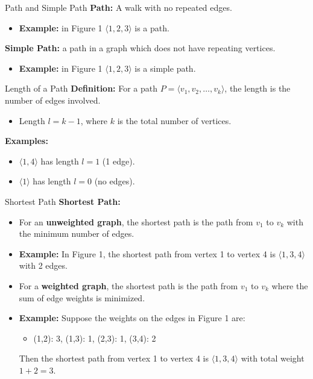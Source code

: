 \documentclass{beamer}
\begin{document}
\begin{frame}{Path and Simple Path}
    \textbf{Path:} A walk with no repeated edges.
    \begin{itemize}
        \item \textbf{Example:} in Figure 1 $\langle 1, 2, 3 \rangle$ is a path.
    \end{itemize}

    \textbf{Simple Path:} a path in a graph which does not have repeating vertices.
    \begin{itemize}
        \item \textbf{Example:} in Figure 1 $\langle 1, 2, 3 \rangle$ is a simple path.
    \end{itemize}
\end{frame}

\begin{frame}{Length of a Path}
    \textbf{Definition:} For a path $P = \langle v_1, v_2, \dots, v_k \rangle$, the length is the number of edges involved.
    \begin{itemize}
        \item Length $l = k - 1$, where $k$ is the total number of vertices.
    \end{itemize}

    \textbf{Examples:}
    \begin{itemize}
        \item $\langle 1, 4 \rangle$ has length $l = 1$ (1 edge).
        \item $\langle 1 \rangle$ has length $l = 0$ (no edges).
    \end{itemize}
\end{frame}

\begin{frame}{Shortest Path}
    \textbf{Shortest Path:}
    \begin{itemize}
        \item For an \textbf{unweighted graph}, the shortest path is the path from $v_1$ to $v_k$ with the minimum number of edges.
        \item \textbf{Example:} In Figure 1, the shortest path from vertex 1 to vertex 4 is $\langle 1, 3, 4 \rangle$ with 2 edges.
        \vspace{1em}
        \item For a \textbf{weighted graph}, the shortest path is the path from $v_1$ to $v_k$ where the sum of edge weights is minimized.
        \item \textbf{Example:} Suppose the weights on the edges in Figure 1 are:
        \begin{itemize}
            \item (1,2): 3, (1,3): 1, (2,3): 1, (3,4): 2
        \end{itemize}
        Then the shortest path from vertex 1 to vertex 4 is $\langle 1, 3, 4 \rangle$ with total weight $1 + 2 = 3$.
    \end{itemize}
\end{frame}
\end{document}
